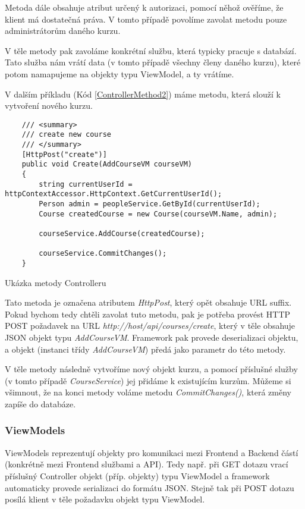 Metoda dále obsahuje atribut určený k autorizaci, pomocí něhož ověříme, že klient má dostatečná práva. V tomto případě povolíme zavolat metodu pouze administrátorům daného kurzu.

V těle metody pak zavoláme konkrétní službu, která typicky pracuje s databází. Tato služba nám vrátí data (v tomto případě všechny členy daného kurzu), které potom namapujeme na objekty typu ViewModel, a ty vrátíme.

\vspace{\baselineskip}

V dalším příkladu (Kód \ref{ControllerMethod2}) máme metodu, která slouží k vytvoření nového kurzu.

\begin{program}
	\begin{lstlisting}
	/// <summary>
	/// create new course
	/// </summary>
	[HttpPost("create")]
	public void Create(AddCourseVM courseVM)
	{
		string currentUserId = httpContextAccessor.HttpContext.GetCurrentUserId();
		Person admin = peopleService.GetById(currentUserId);
		Course createdCourse = new Course(courseVM.Name, admin);
		
		courseService.AddCourse(createdCourse);
		
		courseService.CommitChanges();
	}
	\end{lstlisting}
	\caption{Ukázka metody Controlleru}
	\label{ControllerMethod2}
\end{program}

Tato metoda je označena atributem \textit{HttpPost}, který opět obsahuje URL suffix. Pokud bychom tedy chtěli zavolat tuto metodu, pak je potřeba provést HTTP POST požadavek na URL
\newline
\textit{http://host/api/courses/create}, který v těle obsahuje JSON objekt typu \textit{AddCourseVM}. Framework pak provede deserializaci objektu, a objekt (instanci třídy \textit{AddCourseVM}) předá jako parametr do této metody.

V těle metody následně vytvoříme nový objekt kurzu, a pomocí příslušné služby (v tomto případě \textit{CourseService}) jej přidáme k existujícím kurzům. Můžeme si všimnout, že na konci metody voláme metodu \textit{CommitChanges()}, která změny zapíše do databáze.

\subsubsection*{ViewModels}
\label{serverVM}

ViewModels reprezentují objekty pro komunikaci mezi Frontend a Backend částí (konkrétně mezi Frontend službami a API). Tedy např. při GET dotazu vrací příslušný Controller objekt (příp. objekty) typu ViewModel a framework automaticky provede serializaci do formátu JSON. Stejně tak při POST dotazu posílá klient v těle požadavku objekt typu ViewModel.

